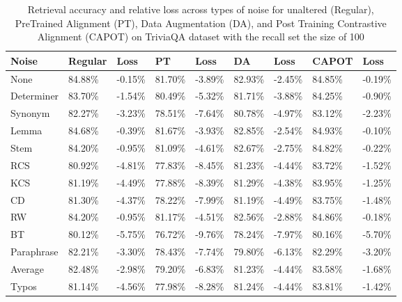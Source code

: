 \begin{table*}[!ht]
    \centering
    
    \begin{tabular}{|l|l|l|l|l|l|l|l|l|}
    \hline
        Noise & Regular & Loss & PT & Loss & DA & Loss & CAPOT & Loss \\ \hline
        None & 84.88\% & -0.15\% & 81.70\% & -3.89\% & 82.93\% & -2.45\% & 84.85\% & -0.19\% \\ \hline
        Determiner & 83.70\% & -1.54\% & 80.49\% & -5.32\% & 81.71\% & -3.88\% & 84.25\% & -0.90\% \\ \hline
        Synonym & 82.27\% & -3.23\% & 78.51\% & -7.64\% & 80.78\% & -4.97\% & 83.12\% & -2.23\% \\ \hline
        Lemma & 84.68\% & -0.39\% & 81.67\% & -3.93\% & 82.85\% & -2.54\% & 84.93\% & -0.10\% \\ \hline
        Stem & 84.20\% & -0.95\% & 81.09\% & -4.61\% & 82.67\% & -2.75\% & 84.82\% & -0.22\% \\ \hline
        RCS & 80.92\% & -4.81\% & 77.83\% & -8.45\% & 81.23\% & -4.44\% & 83.72\% & -1.52\% \\ \hline
        KCS & 81.19\% & -4.49\% & 77.88\% & -8.39\% & 81.29\% & -4.38\% & 83.95\% & -1.25\% \\ \hline
        CD & 81.30\% & -4.37\% & 78.22\% & -7.99\% & 81.19\% & -4.49\% & 83.75\% & -1.48\% \\ \hline
        RW & 84.20\% & -0.95\% & 81.17\% & -4.51\% & 82.56\% & -2.88\% & 84.86\% & -0.18\% \\ \hline
        BT & 80.12\% & -5.75\% & 76.72\% & -9.76\% & 78.24\% & -7.97\% & 80.16\% & -5.70\% \\ \hline
        Paraphrase & 82.21\% & -3.30\% & 78.43\% & -7.74\% & 79.80\% & -6.13\% & 82.29\% & -3.20\% \\ \hline
        Average & 82.48\% & -2.98\% & 79.20\% & -6.83\% & 81.23\% & -4.44\% & 83.58\% & -1.68\% \\ \hline
        Typos & 81.14\% & -4.56\% & 77.98\% & -8.28\% & 81.24\% & -4.44\% & 83.81\% & -1.42\% \\ \hline
    \end{tabular}
    \caption{Retrieval accuracy and relative loss across types of noise for unaltered (Regular), PreTrained Alignment (PT),  Data Augmentation (DA), and Post Training Contrastive Alignment (CAPOT) on TriviaQA dataset with the recall set the size of 100}
    \label{tab:capot-trivia-100}
\end{table*}
